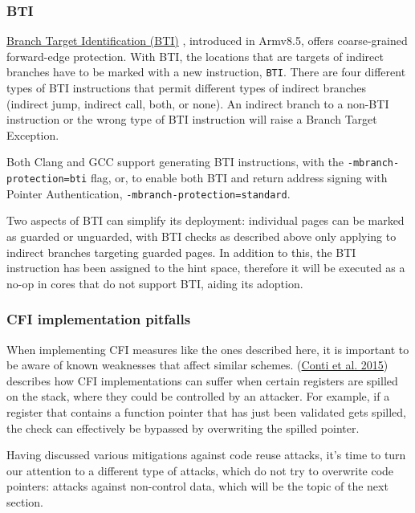 \documentclass[
  a4paper,
]{report}
\begin{document}
\hypertarget{bti}{%
\subsubsection{BTI}\label{bti}}

\href{https://developer.arm.com/documentation/102433/0100/Jump-oriented-programming?lang=en}{Branch
Target Identification (BTI)} , introduced in Armv8.5, offers
coarse-grained forward-edge protection. With BTI, the locations that are
targets of indirect branches have to be marked with a new instruction,
\texttt{BTI}. There are four different types of BTI instructions that
permit different types of indirect branches (indirect jump, indirect
call, both, or none). An indirect branch to a non-BTI instruction or the
wrong type of BTI instruction will raise a Branch Target Exception.

Both Clang and GCC support generating BTI instructions, with the
\texttt{-mbranch-protection=bti} flag, or, to enable both BTI and return
address signing with Pointer Authentication,
\texttt{-mbranch-protection=standard}.

Two aspects of BTI can simplify its deployment: individual pages can be
marked as guarded or unguarded, with BTI checks as described above only
applying to indirect branches targeting guarded pages. In addition to
this, the BTI instruction has been assigned to the hint space, therefore
it will be executed as a no-op in cores that do not support BTI, aiding
its adoption.

\hypertarget{cfi-implementation-pitfalls}{%
\subsubsection{CFI implementation
pitfalls}\label{cfi-implementation-pitfalls}}

When implementing CFI measures like the ones described here, it is
important to be aware of known weaknesses that affect similar schemes.
(\protect\hyperlink{ref-Conti2015}{Conti et al. 2015}) describes how CFI
implementations can suffer when certain registers are spilled on the
stack, where they could be controlled by an attacker. For example, if a
register that contains a function pointer that has just been validated
gets spilled, the check can effectively be bypassed by overwriting the
spilled pointer.

Having discussed various mitigations against code reuse attacks, it's
time to turn our attention to a different type of attacks, which do not
try to overwrite code pointers: attacks against non-control data, which
will be the topic of the next section.
\end{document}
